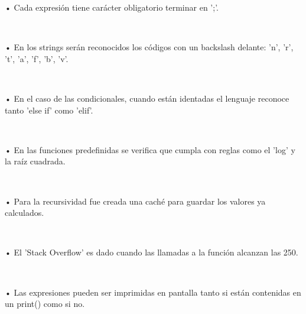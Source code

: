 \documentclass[letterpaper]{article}
\begin{document}
{• Cada expresión tiene carácter obligatorio terminar en ';'.

\

• En los strings serán reconocidos los códigos con un backslash delante: 'n', 'r', 't', 'a', 'f', 'b', 'v'.

\

• En el caso de las condicionales, cuando están identadas el lenguaje reconoce tanto 'else if' como 'elif'.

\

• En las funciones predefinidas se verifica que cumpla con reglas como el 'log' y la raíz cuadrada. 

\

• Para la recursividad fue creada una caché para guardar los valores ya calculados.

\

• El 'Stack Overflow' es dado cuando las llamadas a la función alcanzan las 250. 

\

• Las expresiones pueden ser imprimidas en pantalla tanto si están contenidas en un print() como si no.
}
\end{document}
